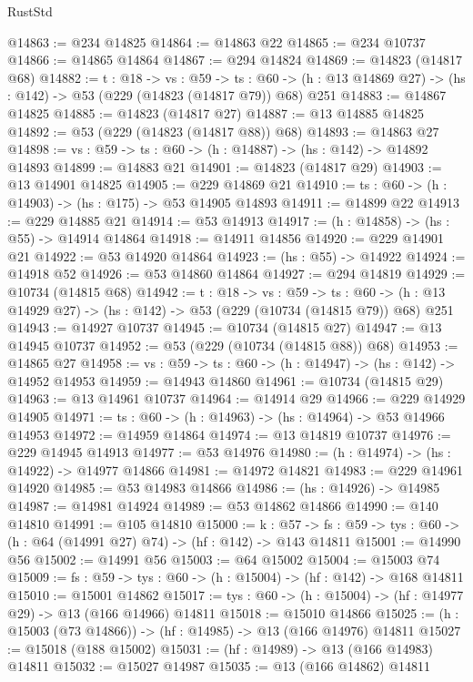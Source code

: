 \begin{lexlean}{RustStd}
\begin{coremodule}
@14863 := @234 @14825
@14864 := @14863 @22
@14865 := @234 @10737
@14866 := @14865 @14864
@14867 := @294 @14824
@14869 := @14823 (@14817 @68)
@14882 := {t : @18} ->
  {vs : @59} ->
  {ts : @60} -> (h : @13 @14869 @27) -> (hs : @142) -> @53 (@229 (@14823 (@14817 @79)) @68) @251
@14883 := @14867 @14825
@14885 := @14823 (@14817 @27)
@14887 := @13 @14885 @14825
@14892 := @53 (@229 (@14823 (@14817 @88)) @68)
@14893 := @14863 @27
@14898 := {vs : @59} -> {ts : @60} -> (h : @14887) -> (hs : @142) -> @14892 @14893
@14899 := @14883 @21
@14901 := @14823 (@14817 @29)
@14903 := @13 @14901 @14825
@14905 := @229 @14869 @21
@14910 := {ts : @60} -> (h : @14903) -> (hs : @175) -> @53 @14905 @14893
@14911 := @14899 @22
@14913 := @229 @14885 @21
@14914 := @53 @14913
@14917 := (h : @14858) -> (hs : @55) -> @14914 @14864
@14918 := @14911 @14856
@14920 := @229 @14901 @21
@14922 := @53 @14920 @14864
@14923 := (hs : @55) -> @14922
@14924 := @14918 @52
@14926 := @53 @14860 @14864
@14927 := @294 @14819
@14929 := @10734 (@14815 @68)
@14942 := {t : @18} ->
  {vs : @59} ->
  {ts : @60} -> (h : @13 @14929 @27) -> (hs : @142) -> @53 (@229 (@10734 (@14815 @79)) @68) @251
@14943 := @14927 @10737
@14945 := @10734 (@14815 @27)
@14947 := @13 @14945 @10737
@14952 := @53 (@229 (@10734 (@14815 @88)) @68)
@14953 := @14865 @27
@14958 := {vs : @59} -> {ts : @60} -> (h : @14947) -> (hs : @142) -> @14952 @14953
@14959 := @14943 @14860
@14961 := @10734 (@14815 @29)
@14963 := @13 @14961 @10737
@14964 := @14914 @29
@14966 := @229 @14929 @14905
@14971 := {ts : @60} -> (h : @14963) -> (hs : @14964) -> @53 @14966 @14953
@14972 := @14959 @14864
@14974 := @13 @14819 @10737
@14976 := @229 @14945 @14913
@14977 := @53 @14976
@14980 := (h : @14974) -> (hs : @14922) -> @14977 @14866
@14981 := @14972 @14821
@14983 := @229 @14961 @14920
@14985 := @53 @14983 @14866
@14986 := (hs : @14926) -> @14985
@14987 := @14981 @14924
@14989 := @53 @14862 @14866
@14990 := @140 @14810
@14991 := @105 @14810
@15000 := {k : @57} ->
  {fs : @59} -> {tys : @60} -> (h : @64 (@14991 @27) @74) -> (hf : @142) -> @143 @14811
@15001 := @14990 @56
@15002 := @14991 @56
@15003 := @64 @15002
@15004 := @15003 @74
@15009 := {fs : @59} -> {tys : @60} -> (h : @15004) -> (hf : @142) -> @168 @14811
@15010 := @15001 @14862
@15017 := {tys : @60} -> (h : @15004) -> (hf : @14977 @29) -> @13 (@166 @14966) @14811
@15018 := @15010 @14866
@15025 := (h : @15003 (@73 @14866)) -> (hf : @14985) -> @13 (@166 @14976) @14811
@15027 := @15018 (@188 @15002)
@15031 := (hf : @14989) -> @13 (@166 @14983) @14811
@15032 := @15027 @14987
@15035 := @13 (@166 @14862) @14811

\end{coremodule}
\end{lexlean}
